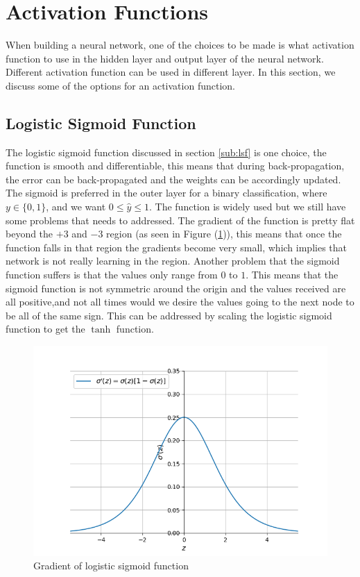 \documentclass[12pt]{report}
\numberwithin{equation}{section}
\begin{document}
\section{Activation Functions}
When building a neural network, one of the choices to be made is what activation function to use in the hidden layer and output layer of the neural network. Different activation function can be used in different layer. In this section, we discuss some of the options for an activation function. 

\subsection{Logistic Sigmoid Function}
The logistic sigmoid function discussed in section \ref{sub:lsf} is one choice, the function is smooth and differentiable, this means that during back-propagation, the error can be back-propagated and the weights can be accordingly updated. The sigmoid is preferred in the outer layer for a binary classification, where $y\in\{0,1\}$, and we want $0\leq\hat{y}\leq 1$. The function is widely used but we still have some problems that needs to addressed. The gradient of the function is pretty flat beyond the $+3$ and $-3$ region (as seen in Figure (\ref{fig:sig_prime})), this means that once the function falls in that region the gradients become very small, which implies that network is not really learning in the region. Another problem that the sigmoid function suffers is that the values only range from $0$ to $1$. This means that the sigmoid function is not symmetric around the origin and the values received are all positive,and not all times would we desire the values going to the next node to be all of the same sign. This can be addressed by scaling the logistic sigmoid function to get the $\tanh$ function.
\newpage
\begin{figure}[htb!]
\centering 
\includegraphics[scale=0.9]{png/sigmoid_prime.png} 
\caption{Gradient of logistic sigmoid function}
\label{fig:sig_prime}
\end{figure}
\end{document}
